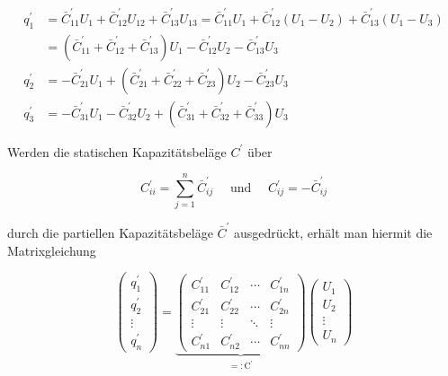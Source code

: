 \begin{align}
	q_{1}^{\prime} & =\bar{C}_{11}^{\prime} U_{1}+\bar{C}_{12}^{\prime} U_{12}+\bar{C}_{13}^{\prime} U_{13}=\bar{C}_{11}^{\prime} U_{1}+\bar{C}_{12}^{\prime}\left(U_{1}-U_{2}\right)+\bar{C}_{13}^{\prime}\left(U_{1}-U_{3}\right)  \\
	& =\left(\bar{C}_{11}^{\prime}+\bar{C}_{12}^{\prime}+\bar{C}_{13}^{\prime}\right) U_{1}-\bar{C}_{12}^{\prime} U_{2}-\bar{C}_{13}^{\prime} U_{3}  \\
	q_{2}^{\prime} & =-\bar{C}_{21}^{\prime} U_{1}+\left(\bar{C}_{21}^{\prime}+\bar{C}_{22}^{\prime}+\bar{C}_{23}^{\prime}\right) U_{2}-\bar{C}_{23}^{\prime} U_{3}  \\
	q_{3}^{\prime} & =-\bar{C}_{31}^{\prime} U_{1}-\bar{C}_{32}^{\prime} U_{2}+\left(\bar{C}_{31}^{\prime}+\bar{C}_{32}^{\prime}+\bar{C}_{33}^{\prime}\right) U_{3} 
\end{align}


Werden die statischen Kapazitätsbeläge $C^{\prime}$ über


\begin{equation}
	C_{i i}^{\prime}=\sum_{j=1}^{n} \bar{C}_{i j}^{\prime} \quad \text { und } \quad C_{i j}^{\prime}=-\bar{C}_{i j}^{\prime} 
\end{equation}


durch die partiellen Kapazitätsbeläge $\bar{C}^{\prime}$ ausgedrückt, erhält man hiermit die Matrixgleichung

\begin{equation}
	\left(\begin{array}{c}
		q_{1}^{\prime}  \\
		q_{2}^{\prime} \\
		\vdots \\
		q_{n}^{\prime}
	\end{array}\right)=\underbrace{\left(\begin{array}{cccc}
			C_{11}^{\prime} & C_{12}^{\prime} & \cdots & C_{1 n}^{\prime} \\
			C_{21}^{\prime} & C_{22}^{\prime} & \cdots & C_{2 n}^{\prime} \\
			\vdots & \vdots & \ddots & \vdots \\
			C_{n 1}^{\prime} & C_{n 2}^{\prime} & \cdots & C_{n n}^{\prime}
		\end{array}\right)}_{=: \mathrm{C}^{\prime}}\left(\begin{array}{c}
		U_{1} \\
		U_{2} \\
		\vdots \\
		U_{n}
	\end{array}\right)
\end{equation}

